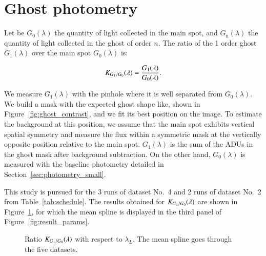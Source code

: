 \appendix

\section{Ghost photometry}
\label{sec:ghost_photometry}

Let be $G_0(\lambda)$ the quantity of light collected in the main spot, and $G_\mathrm{n}(\lambda)$ the quantity of light collected in the ghost of order $n$. The ratio of the 1 order ghost $G_1(\lambda)$ over the main spot $G_0(\lambda)$ is:

\begin{equation}
    K_{G_1/G_0}(\lambda) = \frac{G_1(\lambda)}{G_0(\lambda)}.
    \label{eq:ratio_ghost}
\end{equation}

We measure $G_1(\lambda)$ with the \spinhole pinhole where it is well separated from $G_0(\lambda)$. We build a mask with the expected ghost shape like, shown in Figure~\ref{fig:ghost_contrast}, and we fit its best position on the image. To estimate the background at this position, we assume that the main spot exhibits vertical spatial symmetry and measure the flux within a symmetric mask at the vertically opposite position relative to the main spot. $G_1(\lambda)$ is the sum of the ADUs in the ghost mask after background subtraction. On the other hand, $G_0(\lambda)$ is measured with the baseline photometry detailed in Section~\ref{sec:photometry_small}. 

This study is pursued for the 3 runs of dataset No.~4 and 2 runs of dataset No.~2 from Table~\ref{tab:schedule}. The results obtained for $K_{G_1/G_0}(\lambda)$ are shown in Figure~\ref{fig:ghost_ratio}, for which the mean spline is displayed in the third panel of Figure~\ref{fig:result_params}.

\begin{figure}
     \centering
     \caption{Ratio $K_{G_1/G_0}(\lambda)$ with respect to $\lambda_L$. The mean spline goes through the five datasets.}
     \label{fig:ghost_ratio}
\end{figure}

